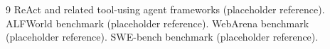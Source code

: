 \documentclass[11pt]{article}
\begin{document}
\begin{thebibliography}{9}
ReAct and related tool-using agent frameworks (placeholder reference).
ALFWorld benchmark (placeholder reference).
WebArena benchmark (placeholder reference).
SWE-bench benchmark (placeholder reference).
\end{thebibliography}
\end{document}
